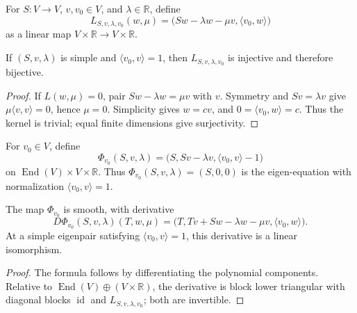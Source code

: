 \begin{definition}
\label{def:eigen-linearisation}
\leanok
For $S\colon V\to V$, $v,v_0\in V$, and $\lambda\in\mathbb R$, define
\[
L_{S,v,\lambda,v_0}(w,\mu)
=\bigl(Sw-\lambda w-\mu v,\langle v_0,w\rangle\bigr)
\]
as a linear map $V\times\mathbb R\to V\times\mathbb R$.
\end{definition}

\begin{lemma}
\label{lem:eigen-linearisation-injective}
\leanok
{}
If $(S,v,\lambda)$ is simple and $\langle v_0,v\rangle=1$, then
$L_{S,v,\lambda,v_0}$ is injective and therefore bijective.
\end{lemma}

\begin{proof}
\leanok
{}
\sketch If $L(w,\mu)=0$, pair $Sw-\lambda w=\mu v$ with $v$. Symmetry and
$Sv=\lambda v$ give $\mu\langle v,v\rangle=0$, hence $\mu=0$. Simplicity gives
$w=cv$, and $0=\langle v_0,w\rangle=c$. Thus the kernel is trivial; equal finite
dimensions give surjectivity.
\end{proof}

\begin{definition}
\label{def:augmented-eigen-equation}
\leanok
For $v_0\in V$, define
\[
\Phi_{v_0}(S,v,\lambda)
=\bigl(S,Sv-\lambda v,\langle v_0,v\rangle-1\bigr)
\]
on $\operatorname{End}(V)\times V\times\mathbb R$. Thus
$\Phi_{v_0}(S,v,\lambda)=(S,0,0)$ is the eigen-equation with normalization
$\langle v_0,v\rangle=1$.
\end{definition}

\begin{lemma}
\label{lem:augmented-eigen-equation-derivative}
\leanok
{}
The map $\Phi_{v_0}$ is smooth, with derivative
\[
D\Phi_{v_0}(S,v,\lambda)(T,w,\mu)
=\bigl(T,Tv+Sw-\lambda w-\mu v,\langle v_0,w\rangle\bigr).
\]
At a simple eigenpair satisfying $\langle v_0,v\rangle=1$, this derivative is a
linear isomorphism.
\end{lemma}

\begin{proof}
\leanok
{}
\sketch The formula follows by differentiating the polynomial components. Relative
to $\operatorname{End}(V)\oplus(V\times\mathbb R)$, the derivative is block lower
triangular with diagonal blocks $\operatorname{id}$ and
$L_{S,v,\lambda,v_0}$; both are invertible.
\end{proof}

